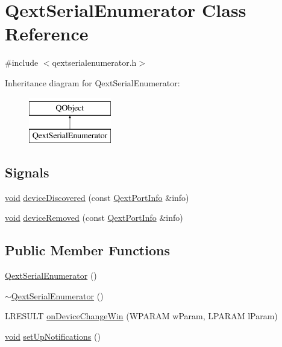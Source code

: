 \hypertarget{class_qext_serial_enumerator}{\section{Qext\-Serial\-Enumerator Class Reference}
\label{class_qext_serial_enumerator}
}


{\ttfamily \#include $<$qextserialenumerator.\-h$>$}

Inheritance diagram for Qext\-Serial\-Enumerator\-:\begin{figure}[H]
\begin{center}
\leavevmode
\includegraphics[height=2.000000cm]{class_qext_serial_enumerator}
\end{center}
\end{figure}
\subsection*{Signals}
\begin{DoxyCompactItemize}
\item 
\hyperlink{group___u_a_v_objects_plugin_ga444cf2ff3f0ecbe028adce838d373f5c}{void} \hyperlink{class_qext_serial_enumerator_a8cd71a66dcd0079328dae193a3e58100}{device\-Discovered} (const \hyperlink{struct_qext_port_info}{Qext\-Port\-Info} \&info)
\item 
\hyperlink{group___u_a_v_objects_plugin_ga444cf2ff3f0ecbe028adce838d373f5c}{void} \hyperlink{class_qext_serial_enumerator_a44e8a909d4bbbb759a79630e01a4f249}{device\-Removed} (const \hyperlink{struct_qext_port_info}{Qext\-Port\-Info} \&info)
\end{DoxyCompactItemize}
\subsection*{Public Member Functions}
\begin{DoxyCompactItemize}
\item 
\hyperlink{class_qext_serial_enumerator_a5444ed89cea823da4fb9b1dda4cccf52}{Qext\-Serial\-Enumerator} ()
\item 
\hyperlink{class_qext_serial_enumerator_ae4d0507728ffb990606ff8dde3da6e6d}{$\sim$\-Qext\-Serial\-Enumerator} ()
\item 
L\-R\-E\-S\-U\-L\-T \hyperlink{class_qext_serial_enumerator_aa1bee004d2de7bdead5b139cfe46f86a}{on\-Device\-Change\-Win} (W\-P\-A\-R\-A\-M w\-Param, L\-P\-A\-R\-A\-M l\-Param)
\item 
\hyperlink{group___u_a_v_objects_plugin_ga444cf2ff3f0ecbe028adce838d373f5c}{void} \hyperlink{class_qext_serial_enumerator_a5a8caf21f4ad519323f13219651274ec}{set\-Up\-Notifications} ()
\end{DoxyCompactItemize}
